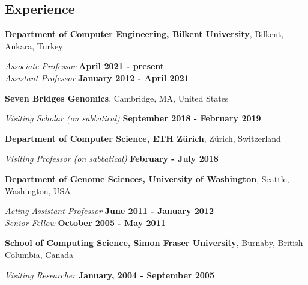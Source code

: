 \documentclass[margin,line]{res}
\newcommand{\junk}[1]{}
\begin{document}
\begin{resume}
          \section{\sc Experience}
                  {\bf Department of Computer Engineering, Bilkent University},
                  Bilkent, Ankara, Turkey
                  
                  \vspace{-.3cm}
                         {\em Associate Professor} \hfill {\bf April 2021 - present}\\ 
                         {\em Assistant Professor} \hfill {\bf January 2012 - April 2021} 

                 {\bf Seven Bridges Genomics},
                  Cambridge, MA, United States
                  
                  \vspace{-.1cm}
                         {\em Visiting Scholar (on sabbatical)} \hfill {\bf September 2018 - February 2019} 

                 {\bf Department of Computer Science, ETH Zürich},
                  Zürich, Switzerland
                  
                  \vspace{-.1cm}
                         {\em Visiting Professor (on sabbatical)} \hfill {\bf February - July 2018} 
                         
                 {\bf Department of Genome Sciences, University of Washington},
                         Seattle, Washington, USA
                         
                         \vspace{-.3cm}
                                {\em Acting Assistant Professor} \hfill {\bf June 2011 - January 2012} \\                           %
                                      {\em Senior Fellow} \hfill {\bf October 2005 - May 2011}
                                       
                          {\bf School of Computing Science, Simon Fraser University},
                          Burnaby, British Columbia, Canada

                          \vspace{-.3cm}
                                         {\em Visiting Researcher} \hfill {\bf January, 2004 - September 2005}\\
                                         \junk{
                                         Worked on RNA-RNA interaction algorithms, and RNA secondary structure
                                         motif discovery problems, collaborating with Peter Unrau, Kaizhong
                                         Zhang, and Jeremy Buhler.
                                         }
                                       

\end{resume}
\end{document}
